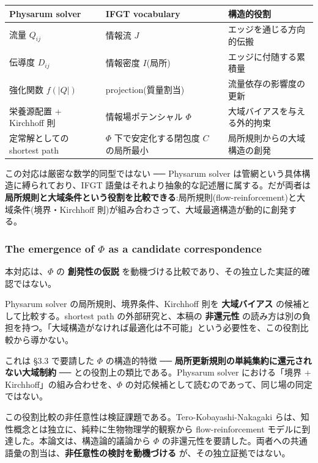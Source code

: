 \begin{table}[H]
\centering
\small
\begin{tabularx}{\textwidth}{>{\raggedright\arraybackslash}X>{\raggedright\arraybackslash}X>{\raggedright\arraybackslash}X}
\toprule
Physarum solver & IFGT vocabulary & 構造的役割 \\
\midrule
流量 $Q_{ij}$ & 情報流 $J$ & エッジを通じる方向的伝搬 \\
伝導度 $D_{ij}$ & 情報密度 $I$(局所) & エッジに付随する累積量 \\
強化関数 $f(\lvert Q\rvert)$ & projection(質量割当) & 流量依存の影響度の更新 \\
栄養源配置 + Kirchhoff 則 & 情報場ポテンシャル $\Phi$ & 大域バイアスを与える外的拘束 \\
定常解としての shortest path & $\Phi$ 下で安定化する閉包度 $C$ の局所最小 & 局所規則からの大域構造の創発 \\
\bottomrule
\end{tabularx}
\end{table}


この対応は厳密な数学的同型ではない ── Physarum solver は管網という具体構造に縛られており、IFGT 語彙はそれより抽象的な記述層に属する。だが両者は \textbf{局所規則と大域条件という役割を比較できる}:局所規則(flow-reinforcement)と大域条件(境界・Kirchhoff 則)が組み合わさって、大域最適構造が動的に創発する。

\subsubsection{The emergence of $\Phi$ as a candidate correspondence}


本対応は、$\Phi$ の \textbf{創発性の仮説} を動機づける比較であり、その独立した実証的確認ではない。

Physarum solver の局所規則、境界条件、Kirchhoff 則を \textbf{大域バイアス} の候補として比較する。shortest path の外部研究と、本稿の \textbf{非還元性} の読み方は別の負担を持つ。「大域構造がなければ最適化は不可能」という必要性を、この役割比較から導かない。

これは \S{}3.3 で要請した $\Phi$ の構造的特徴 ── \textbf{局所更新規則の単純集約に還元されない大域制約} ── との役割上の類比である。Physarum solver における「境界 + Kirchhoff」の組み合わせを、$\Phi$ の対応候補として読むのであって、同じ場の同定ではない。

この役割比較の非任意性は検証課題である。Tero-Kobayashi-Nakagaki らは、知性概念とは独立に、純粋に生物物理学的観察から flow-reinforcement モデルに到達した。本論文は、構造論的議論から $\Phi$ の非還元性を要請した。両者への共通語彙の割当は、\textbf{非任意性の検討を動機づける} が、その独立証拠ではない。

